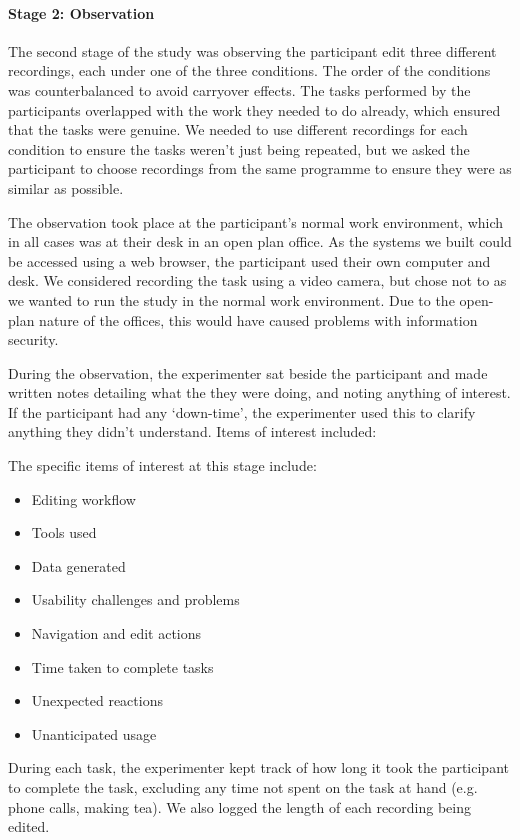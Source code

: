 \paragraph{Stage 2: Observation}

The second stage of the study was observing the participant edit three different recordings, each under one of the
three conditions.  The order of the conditions was counterbalanced to avoid carryover effects.  The tasks performed by
the participants overlapped with the work they needed to do already, which ensured that the tasks were genuine.  We
needed to use different recordings for each condition to ensure the tasks weren't just being repeated, but we asked the
participant to choose recordings from the same programme to ensure they were as similar as possible.

The observation took place at the participant's normal work environment, which in all cases was at their desk in an
open plan office. As the systems we built could be accessed using a web browser, the participant used their own
computer and desk. We considered recording the task using a video camera, but chose not to as we wanted to run the
study in the normal work environment. Due to the open-plan nature of the offices, this would have caused problems with
information security.

During the observation, the experimenter sat beside the participant and made written notes detailing what the
they were doing, and noting anything of interest. If the participant had any `down-time', the experimenter used this to
clarify anything they didn't understand. Items of interest included:

The specific items of interest at this stage include:
\begin{itemize}[noitemsep]
  \item Editing workflow
  \item Tools used
  \item Data generated
  \item Usability challenges and problems
  \item Navigation and edit actions
  \item Time taken to complete tasks
  \item Unexpected reactions
  \item Unanticipated usage
\end{itemize}

During each task, the experimenter kept track of how long it took the participant to complete the task, excluding any
time not spent on the task at hand (e.g. phone calls, making tea). We also logged the length of each recording being
edited.

